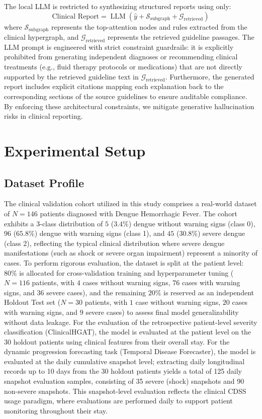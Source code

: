 \documentclass[conference]{IEEEtran}
\begin{document}
The local LLM is restricted to synthesizing structured reports using only:
\begin{equation}
    \text{Clinical Report} = \operatorname{LLM}(\hat{y} + \mathcal{S}_{\text{subgraph}} + \mathcal{G}_{\text{retrieved}})
\end{equation}
where $\mathcal{S}_{\text{subgraph}}$ represents the top-attention nodes and rules extracted from the clinical hypergraph, and $\mathcal{G}_{\text{retrieved}}$ represents the retrieved guideline passages. The LLM prompt is engineered with strict constraint guardrails: it is explicitly prohibited from generating independent diagnoses or recommending clinical treatments (e.g., fluid therapy protocols or medications) that are not directly supported by the retrieved guideline text in $\mathcal{G}_{\text{retrieved}}$. Furthermore, the generated report includes explicit citations mapping each explanation back to the corresponding sections of the source guidelines to ensure auditable compliance. By enforcing these architectural constraints, we mitigate generative hallucination risks in clinical reporting.

\section{Experimental Setup}
\label{sec:experiments}

\subsection{Dataset Profile}
The clinical validation cohort utilized in this study comprises a real-world dataset of $N=146$ patients diagnosed with Dengue Hemorrhagic Fever. The cohort exhibits a 3-class distribution of $5$ ($3.4\%$) dengue without warning signs (class 0), $96$ ($65.8\%$) dengue with warning signs (class 1), and $45$ ($30.8\%$) severe dengue (class 2), reflecting the typical clinical distribution where severe dengue manifestations (such as shock or severe organ impairment) represent a minority of cases. To perform rigorous evaluation, the dataset is split at the patient level: $80\%$ is allocated for cross-validation training and hyperparameter tuning ($N=116$ patients, with $4$ cases without warning signs, $76$ cases with warning signs, and $36$ severe cases), and the remaining $20\%$ is reserved as an independent Holdout Test set ($N=30$ patients, with $1$ case without warning signs, $20$ cases with warning signs, and $9$ severe cases) to assess final model generalizability without data leakage. For the evaluation of the retrospective patient-level severity classification (ClinicalHGAT), the model is evaluated at the patient level on the 30 holdout patients using clinical features from their overall stay. For the dynamic progression forecasting task (Temporal Disease Forecaster), the model is evaluated at the daily cumulative snapshot level; extracting daily longitudinal records up to 10 days from the 30 holdout patients yields a total of 125 daily snapshot evaluation samples, consisting of 35 severe (shock) snapshots and 90 non-severe snapshots. This snapshot-level evaluation reflects the clinical CDSS usage paradigm, where evaluations are performed daily to support patient monitoring throughout their stay.
\end{document}

